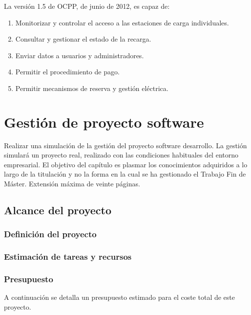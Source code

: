 \documentclass[12pt,a4paper,onecolumn,oneside]{report}
\begin{document}
La versión 1.5 de OCPP, de junio de 2012, es capaz de:

\begin{enumerate}

\item Monitorizar y controlar el acceso a las estaciones de carga individuales.
\item Consultar y gestionar el estado de la recarga.
\item Enviar datos a usuarios y administradores.
\item Permitir el procedimiento de pago.
\item Permitir mecanismos de reserva y gestión eléctrica.

\end{enumerate}


\chapter{Gestión de proyecto software}
\label{Gestión de proyecto software}

Realizar una simulación de la gestión del proyecto software desarrollo. La gestión simulará un proyecto real, realizado con las condiciones habituales del entorno empresarial. El objetivo del capítulo es plasmar los conocimientos adquiridos a lo largo de la titulación y no la forma en la cual se ha gestionado el Trabajo Fin de Máster. Extensión máxima de veinte páginas.

\section{Alcance del proyecto}
\label{Alcance del proyecto}

\subsection{Definición del proyecto}

\subsection{Estimación de tareas y recursos}

\subsection{Presupuesto}

A continuación se detalla un presupuesto estimado para el coste total de este proyecto.
\end{document}

